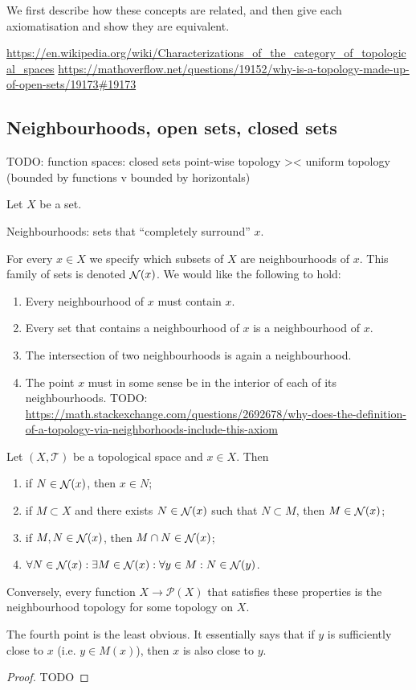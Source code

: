 We first describe how these concepts are related, and then give each axiomatisation and show they are equivalent.

\url{https://en.wikipedia.org/wiki/Characterizations_of_the_category_of_topological_spaces} 
\url{https://mathoverflow.net/questions/19152/why-is-a-topology-made-up-of-open-sets/19173#19173}

\subsection{Neighbourhoods, open sets, closed sets}
TODO: function spaces: closed sets point-wise topology >< uniform topology (bounded by functions v bounded by horizontals)

Let $X$ be a set.

Neighbourhoods: sets that ``completely surround'' $x$.

For every $x\in X$ we specify which subsets of $X$ are neighbourhoods of $x$. This family of sets is denoted $\mathop{\mathcal{N}}(x)$. We would like the following to hold:
\begin{enumerate}
\item Every neighbourhood of $x$ must contain $x$.
\item Every set that contains a neighbourhood of $x$ is a neighbourhood of $x$.
\item The intersection of two neighbourhoods is again a neighbourhood.
\item The point $x$ must in some sense be in the interior of each of its neighbourhoods. TODO: \url{https://math.stackexchange.com/questions/2692678/why-does-the-definition-of-a-topology-via-neighborhoods-include-this-axiom}
\end{enumerate}

\begin{proposition}
Let $(X,\mathcal{T})$ be a topological space and $x\in X$. Then
\begin{enumerate}
\item if $N\in\mathop{\mathcal{N}}(x)$, then $x\in N$;
\item if $M\subset X$ and there exists $N\in\mathop{\mathcal{N}}(x)$ such that $N\subset M$, then $M\in\mathop{\mathcal{N}}(x)$;
\item if $M,N\in\mathop{\mathcal{N}}(x)$, then $M\cap N\in\mathop{\mathcal{N}}(x)$;
\item $\forall N\in\mathop{\mathcal{N}}(x): \exists M\in\mathop{\mathcal{N}}(x): \forall y\in M: N\in\mathop{\mathcal{N}}(y)$.
\end{enumerate}
Conversely, every function $X\to \mathcal{P}(X)$ that satisfies these properties is the neighbourhood topology for some topology on $X$.
\end{proposition}
The fourth point is the least obvious. It essentially says that if $y$ is sufficiently close to $x$ (i.e. $y\in M(x)$), then $x$ is also close to $y$.
\begin{proof}
TODO
\end{proof}

